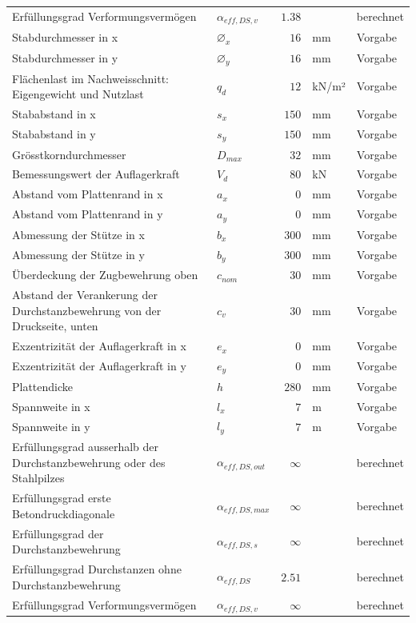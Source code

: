 \documentclass[11pt,a4paper]{article}
\begin{document}
\begin{xltabular}{\linewidth}{>{\raggedright\arraybackslash}Xlrll}
Erfüllungsgrad Verformungsvermögen & $\alpha_{eff,DS,v}$ & $1.38$ &  & berechnet \\
Stabdurchmesser in x & $\varnothing_x$ & $16$ & mm & Vorgabe \\
Stabdurchmesser in y & $\varnothing_y$ & $16$ & mm & Vorgabe \\
Flächenlast im Nachweisschnitt: Eigengewicht und Nutzlast & $q_d$ & $12$ & kN/m² & Vorgabe \\
Stababstand in x & $s_x$ & $150$ & mm & Vorgabe \\
Stababstand in y & $s_y$ & $150$ & mm & Vorgabe \\
Grösstkorndurchmesser & $D_{max}$ & $32$ & mm & Vorgabe \\
Bemessungswert der Auflagerkraft & $V_d$ & $80$ & kN & Vorgabe \\
Abstand vom Plattenrand in x & $a_x$ & $0$ & mm & Vorgabe \\
Abstand vom Plattenrand in y & $a_y$ & $0$ & mm & Vorgabe \\
Abmessung der Stütze in x & $b_x$ & $300$ & mm & Vorgabe \\
Abmessung der Stütze in y & $b_y$ & $300$ & mm & Vorgabe \\
Überdeckung der Zugbewehrung oben & $c_{nom}$ & $30$ & mm & Vorgabe \\
Abstand der Verankerung der Durchstanzbewehrung von der Druckseite, unten & $c_v$ & $30$ & mm & Vorgabe \\
Exzentrizität der Auflagerkraft in x & $e_x$ & $0$ & mm & Vorgabe \\
Exzentrizität der Auflagerkraft in y & $e_y$ & $0$ & mm & Vorgabe \\
Plattendicke & $h$ & $280$ & mm & Vorgabe \\
Spannweite in x & $l_x$ & $7$ & m & Vorgabe \\
Spannweite in y & $l_y$ & $7$ & m & Vorgabe \\
Erfüllungsgrad ausserhalb der Durchstanzbewehrung oder des Stahlpilzes & $\alpha_{eff,DS,out}$ & $\infty$ &  & berechnet \\
Erfüllungsgrad erste Betondruckdiagonale & $\alpha_{eff,DS,max}$ & $\infty$ &  & berechnet \\
Erfüllungsgrad der Durchstanzbewehrung & $\alpha_{eff,DS,s}$ & $\infty$ &  & berechnet \\
Erfüllungsgrad Durchstanzen ohne Durchstanzbewehrung & $\alpha_{eff,DS}$ & $2.51$ &  & berechnet \\
Erfüllungsgrad Verformungsvermögen & $\alpha_{eff,DS,v}$ & $\infty$ &  & berechnet \\

\end{xltabular}
\end{document}
